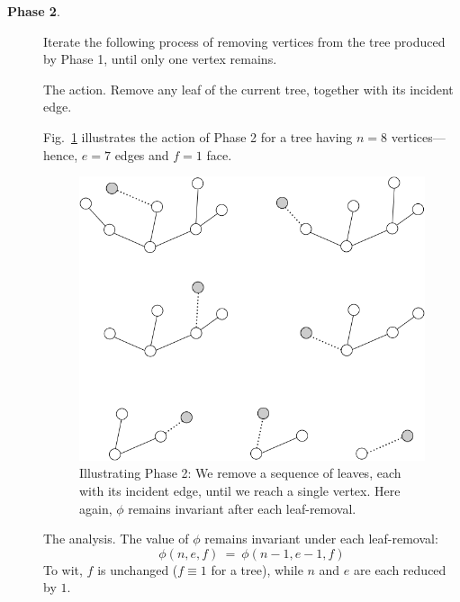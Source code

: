 \begin{description}
\medskip\item[{\bf Phase 2}.]
Iterate the following process of removing vertices from the tree produced by Phase 1, until only one vertex remains.

\medskip

{\sf The action}.
Remove any leaf of the current tree, together with its incident edge.

\smallskip

Fig.~\ref{fig:planarStep2} illustrates the action of Phase  2 for a tree having $n=8$ vertices---hence, $e=7$ edges and $f=1$ face.
\begin{figure}[hbt]
\begin{center}
   \includegraphics[scale=0.35]{FiguresGraph/planarStep2}
 \caption{Illustrating Phase 2: We remove a sequence of leaves, each with its incident edge, until we reach a single vertex.  Here again, $\phi$ remains invariant after each leaf-removal.}
  \label{fig:planarStep2}
\end{center}
\end{figure}

\medskip

{\sf The analysis}.
The value of $\phi$ remains invariant under each leaf-removal:
\[ \phi(n,e,f) \ = \ \phi(n-1,e-1,f) \]
To wit, $f$ is unchanged ($f \equiv 1$ for a tree), while $n$ and $e$ are each reduced by $1$.
\end{description}

\medskip

